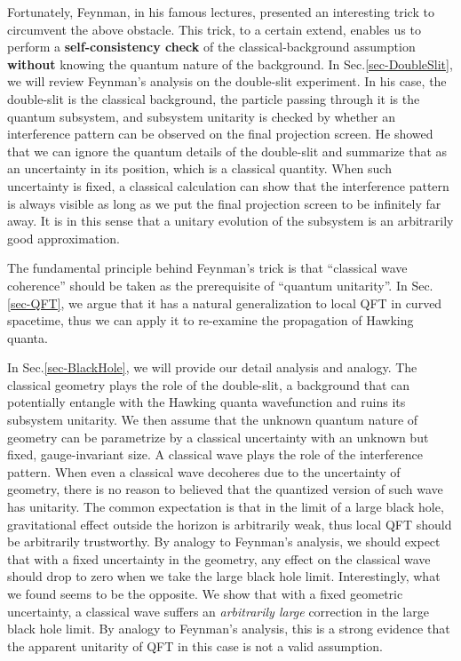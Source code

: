 \documentclass[aps,showpacs,twocolumn,floats,prd,superscriptaddress,nofootinbib]{revtex4-1}
\begin{document}
Fortunately, Feynman, in his famous lectures, presented an interesting trick to circumvent the above obstacle. 
This trick, to a certain extend, enables us to perform a {\bf self-consistency check} of the classical-background assumption {\bf without} knowing the quantum nature of the background.
In Sec.\ref{sec-DoubleSlit}, we will review Feynman's analysis on the double-slit experiment. 
In his case, the double-slit is the classical background, the particle passing through it is the quantum subsystem, and subsystem unitarity is checked by whether an interference pattern can be observed on the final projection screen. 
He showed that we can ignore the quantum details of the double-slit and summarize that as an uncertainty in its position, which is a classical quantity. 
When such uncertainty is fixed, a classical calculation can show that the interference pattern is always visible as long as we put the final projection screen to be infinitely far away. 
It is in this sense that a unitary evolution of the subsystem is an arbitrarily good approximation.

The fundamental principle behind Feynman's trick is that ``classical wave coherence'' should be taken as the prerequisite of ``quantum unitarity''. 
In Sec.\ref{sec-QFT}, we argue that it has a natural generalization to local QFT in curved spacetime, thus we can apply it to re-examine the propagation of Hawking quanta. 

In Sec.\ref{sec-BlackHole}, we will provide our detail analysis and analogy. 
The classical geometry plays the role of the double-slit, a background that can potentially entangle with the Hawking quanta wavefunction and ruins its subsystem unitarity. 
We then assume that the unknown quantum nature of geometry can be parametrize by a classical uncertainty with an unknown but fixed, gauge-invariant size. 
A classical wave plays the role of the interference pattern. 
When even a classical wave decoheres due to the uncertainty of geometry, there is no reason to believed that the quantized version of such wave has unitarity.
The common expectation is that in the limit of a large black hole, gravitational effect outside the horizon is arbitrarily weak, thus local QFT should be arbitrarily trustworthy.
By analogy to Feynman's analysis, we should expect that with a fixed uncertainty in the geometry, any effect on the classical wave should drop to zero when we take the large black hole limit.
Interestingly, what we found seems to be the opposite. 
We show that with a fixed geometric uncertainty, a classical wave suffers an {\it arbitrarily large} correction in the large black hole limit.
By analogy to Feynman's analysis, this is a strong evidence that the apparent unitarity of QFT in this case is not a valid assumption.
\end{document}
